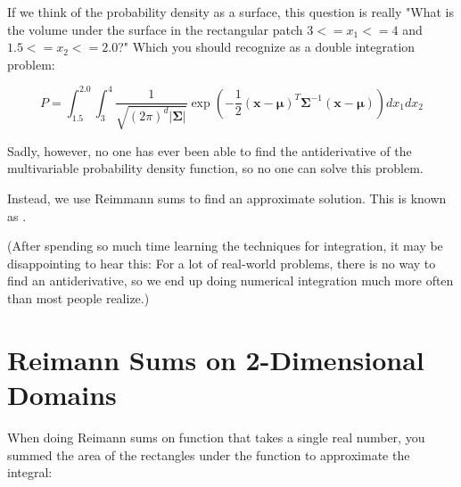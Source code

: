 If we think of the probability density as a surface, this question is really "What is the volume under the surface in the rectangular patch $3 <= x_1 <= 4$ and $1.5 <=x_2 <= 2.0$?"  Which you should recognize as a double integration problem:

\begin{equation*}
P = \int_{1.5}^{2.0} \int_{3}^4 \frac{1}{\sqrt{(2\pi)^d|\mathbf{\Sigma}|}}\exp\left(-\frac{1}{2}(\mathbf{x}-\boldsymbol\mu)^T\mathbf{\Sigma}^{-1}(\mathbf{x}-\boldsymbol\mu)\right) dx_1 dx_2
\end{equation*}

Sadly, however, no one has ever been able to find the antiderivative of the multivariable probability density function, so no one can solve this problem.

Instead, we use Reimmann sums to find an approximate solution.  This is known as .

(After spending so much time learning the techniques for integration, it may be disappointing to hear this:
For a lot of real-world problems, there is no way to find an antiderivative, so we end up doing numerical integration much more often than most people realize.)

\section{Reimann Sums on 2-Dimensional Domains}

When doing Reimann sums on function that takes a single real number, you summed the area of the rectangles under the function to approximate the integral:

